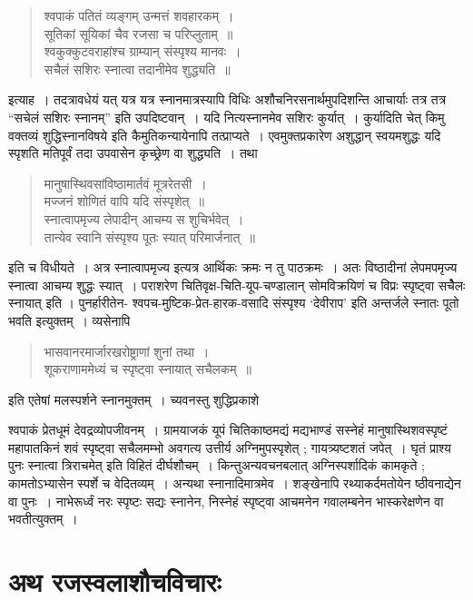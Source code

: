 {\begin{verse}
श्वपाकं पतितं व्यङ्गम् उन्मत्तं शवहारकम्~। \\
सूतिकां सूयिकां चैव रजसा च परिप्लुताम्~॥ \\
श्वकुक्कुटवराहांश्च ग्राम्यान् संस्पृश्य मानवः~। \\
सचैलं सशिरः स्नात्वा तदानीमेव शुद्ध्यति~॥
\end{verse}
इत्याह~। तदत्रावधेयं यत् यत्र यत्र स्नानमात्रस्यापि विधिः अशौचनिरसनार्थमुपदिशन्ति आचार्याः तत्र तत्र “सचेलं सशिरः स्नानम्” इति उपदिष्टवान्~। यदि नित्यस्नानमेव सशिरः कुर्यात्~। कुर्यादिति चेत् किमु वक्तव्यं शुद्धिस्नानविषये इति कैमुतिकन्यायेनापि तत्प्राप्यते~। एवमुक्तप्रकारेण अशुद्धान् स्वयमशुद्धः यदि स्पृशति मतिपूर्वं तदा उपवासेन कृच्छ्रेण वा शुद्ध्यति~। तथा  \enginline{-}
\begin{verse}
मानुषास्थिवसांविष्ठामार्तवं मूत्ररेतसी~। \\
मज्जनं शोणितं वापि यदि संस्पृशेत्~॥ \\
स्नात्वापमृज्य लेपादीन् आचम्य स शुचिर्भवेत्~। \\ 
तान्येव स्वानि संस्पृश्य पूतः स्यात् परिमार्जनात्~॥
\end{verse}
इति च विधीयते~। अत्र स्नात्वापमृज्य इत्यत्र आर्थिकः क्रमः न तु पाठक्रमः~। अतः विष्ठादीनां लेपमपमृज्य स्नात्वा आचम्य शुद्धः स्यात्~। पराशरेण चितिवृक्ष-चिति-यूप-चण्डालान् सोमविक्रयिणं च विप्रः स्पृष्ट्वा सचैेलः स्नायात् इति । पुनर्हारीतेन- श्वपच-मुष्टिक-प्रेत-हारक-वसादि संस्पृश्य ‘देवीराप’ इति अन्तर्जले स्नातः पूतो भवति इत्युक्तम्~। व्यसेनापि \enginline{-} 
\begin{verse}
भासवानरमार्जारखरोष्ट्राणां शुनां तथा~। \\
शूकराणाममेध्यं च स्पृष्ट्वा स्नायात् सचैलकम्~॥  
\end{verse}
इति एतेषां मलस्पर्शने स्नानमुक्तम्~। च्यवनस्तु शुद्धिप्रकाशे \enginline{-}

श्वपाकं प्रेतधूमं देवद्रव्योपजीवनम्~। ग्रामयाजकं यूपं चितिकाष्ठमद्यं मद्यभाण्डं सस्नेहं मानुषास्थिशवस्पृष्टं महापातकिनं शवं स्पृष्ट्वा सचैलमम्भो अवगत्य उत्तीर्य अग्निमुपस्पृशेत् ; गायत्र्यष्टशतं जपेत्~। घृतं प्राश्य पुनः स्नात्वा त्रिराचमेत् इति विहितं दीर्घशौचम्~। किन्तु\break अन्यवचनबलात् अग्निस्पर्शादिकं कामकृते ; कामतोऽभ्यासेन स्पर्शे च वेदितव्यम्~। अन्यथा स्नानादिमात्रमेव~। शङ्खेनापि रथ्याकर्दमतोयेन ष्ठीवनाद्येन वा पुनः~। नाभेरूर्ध्वं नरः स्पृष्टः सद्यः स्नानेन, निस्नेहं स्पृष्ट्वा आचमनेन गवालम्बनेन भास्करेक्षणेन वा भवतीत्युक्तम्~। 
~\\[-1cm]
\section*{अथ रजस्वलाशौचविचारः}

}
